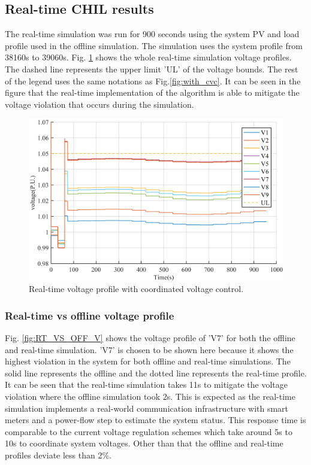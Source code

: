 \subsection{Real-time CHIL results}
The real-time simulation was run for 900 seconds using the system PV and load profile used in the offline simulation. The simulation uses the system profile from 38160s to 39060s. Fig. \ref{fig:RT_VVC} shows the whole real-time simulation voltage profiles. The dashed line represents the upper limit 'UL' of the voltage bounds. The rest of the legend uses the same notations as Fig.\ref{fig:with_cvc}. It can be seen in the figure that the real-time implementation of the algorithm is able to mitigate the voltage violation that occurs during the simulation.

\begin{figure}[!h]
\centering
\includegraphics[width=\linewidth]{figs/RT_VOLTAGES.png}
\caption{Real-time voltage profile with coordinated voltage control.}
\label{fig:RT_VVC}
\end{figure}

\subsubsection{Real-time vs offline voltage profile}
Fig. \ref{fig:RT_VS_OFF_V} shows the voltage profile of 'V7' for both the offline and real-time simulation. 'V7' is chosen to be shown here because it shows the highest violation in the system for both offline and real-time simulations. The solid line represents the offline and the dotted line represents the real-time profile. It can be seen that the real-time simulation takes 11s to mitigate the voltage violation where the offline simulation took 2s. This is expected as the real-time simulation implements a real-world communication infrastructure with smart meters and a power-flow step to estimate the system status. This response time is comparable to the current voltage regulation schemes which take around 5s to 10s to coordinate system voltages. Other than that the offline and real-time profiles deviate less than 2\%. 

